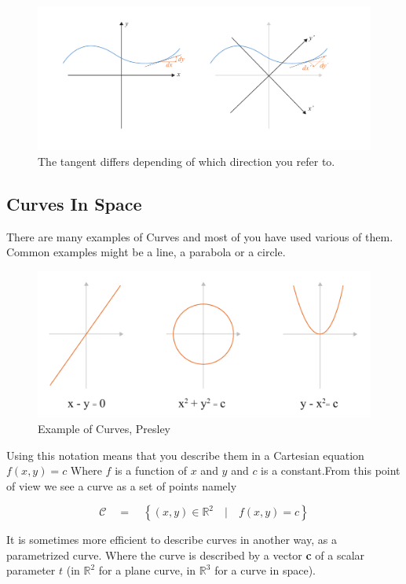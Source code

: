 \begin{figure}[H]
\centering
\includegraphics[width=0.9\linewidth ]{figure/Theory/intrisic_extrinsic1.pdf}
\caption{The tangent differs depending of which direction you refer to. }
\end{figure}

\subsection{Curves In Space}
There are many examples of Curves and most of you have used various of them. Common examples might be a line, a parabola or a circle. 


\begin{figure}[H]
\centering
\includegraphics[width=0.9\linewidth ]{figure/Theory/CurveExample.pdf}  \caption{Example of Curves, Presley }
\end{figure}

Using this notation means that you describe them in a Cartesian equation $f(x,y) = c$
Where $f$ is a function of $x$ and $y$ and $c$ is a constant.From this point of view we see a curve as a set of points namely

$$ \mathcal{C}\quad =\quad \left\{ (x,y) \in \mathbb{R}^2\quad |\quad f(x,y) = c \right\} $$


It is sometimes more efficient to describe curves in another way, as a parametrized curve. Where the curve is described by a vector \textbf{c} of a scalar parameter $t$ (in $\mathbb{R}^2$ for a plane curve, in $\mathbb{R}^3$ for a curve in space). 



